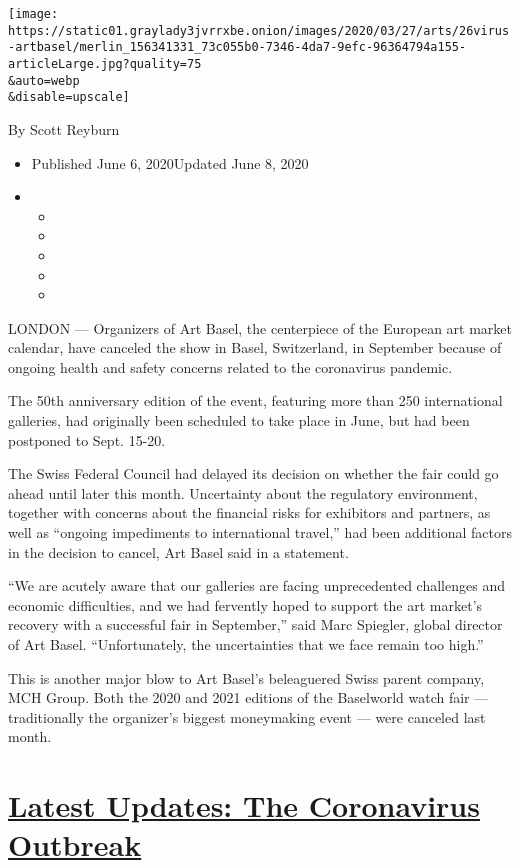 \texttt{[image: https://static01.graylady3jvrrxbe.onion/images/2020/03/27/arts/26virus-artbasel/merlin\_156341331\_73c055b0-7346-4da7-9efc-96364794a155-articleLarge.jpg?quality=75\\\&auto=webp\\\&disable=upscale]}

By Scott Reyburn

\begin{itemize}
\item
  Published June 6, 2020Updated June 8, 2020
\item
  \begin{itemize}
  \item
  \item
  \item
  \item
  \item
  \end{itemize}
\end{itemize}

LONDON --- Organizers of Art Basel, the centerpiece of the European art
market calendar, have canceled the show in Basel, Switzerland, in
September because of ongoing health and safety concerns related to the
coronavirus pandemic.

The 50th anniversary edition of the event, featuring more than 250
international galleries, had originally been scheduled to take place in
June, but had been postponed to Sept. 15-20.

The Swiss Federal Council had delayed its decision on whether the fair
could go ahead until later this month. Uncertainty about the regulatory
environment, together with concerns about the financial risks for
exhibitors and partners, as well as ``ongoing impediments to
international travel,'' had been additional factors in the decision to
cancel, Art Basel said in a statement.

``We are acutely aware that our galleries are facing unprecedented
challenges and economic difficulties, and we had fervently hoped to
support the art market's recovery with a successful fair in September,''
said Marc Spiegler, global director of Art Basel. ``Unfortunately, the
uncertainties that we face remain too high.''

This is another major blow to Art Basel's beleaguered Swiss parent
company, MCH Group. Both the 2020 and 2021 editions of the Baselworld
watch fair --- traditionally the organizer's biggest moneymaking event
--- were canceled last month.

\hypertarget{latest-updates-the-coronavirus-outbreak}{%
\section{\texorpdfstring{\href{https://www.nytimes3xbfgragh.onion/2020/08/20/world/coronavirus-covid.html?action=click\&pgtype=Article\&state=default\&region=MAIN_CONTENT_1\&context=storylines_live_updates}{Latest
Updates: The Coronavirus
Outbreak}}{Latest Updates: The Coronavirus Outbreak}}\label{latest-updates-the-coronavirus-outbreak}}

